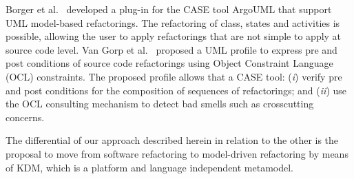 Borger et al.~\cite{Boger2002} developed a plug-in for the CASE tool ArgoUML that support UML model-based refactorings. The refactoring of class, states and activities is possible, allowing the user to apply refactorings that are not simple to apply at source code level. 
Van Gorp et al.~\cite{Gorp03towardsautomating} proposed a UML profile to express pre and post conditions of source code refactorings using Object Constraint Language (OCL) constraints. The proposed profile allows that a CASE tool: (\textit{i}) verify pre and post conditions for the composition of sequences of refactorings; and (\textit{ii}) use the OCL consulting mechanism to detect bad smells such as crosscutting concerns.

The differential of our approach described herein in relation to the other is the proposal to move from software refactoring to model-driven refactoring by means of KDM, which is a platform and language independent metamodel.
